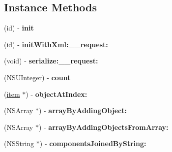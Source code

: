 \subsection*{Instance Methods}
\begin{DoxyCompactItemize}
\item 
\hypertarget{interfaceget_items_by_s_s_c_c_response_adf8f3b643a4ba2013d20ca34a440359d}{}(id) -\/ {\bfseries init}\label{interfaceget_items_by_s_s_c_c_response_adf8f3b643a4ba2013d20ca34a440359d}

\item 
\hypertarget{interfaceget_items_by_s_s_c_c_response_a1d0585c2d9bd9ccbcd6f748835030e3e}{}(id) -\/ {\bfseries init\+With\+Xml\+:\+\_\+\+\_\+request\+:}\label{interfaceget_items_by_s_s_c_c_response_a1d0585c2d9bd9ccbcd6f748835030e3e}

\item 
\hypertarget{interfaceget_items_by_s_s_c_c_response_ae79725ad9b9e49228a5e4a8cfd2f793b}{}(void) -\/ {\bfseries serialize\+:\+\_\+\+\_\+request\+:}\label{interfaceget_items_by_s_s_c_c_response_ae79725ad9b9e49228a5e4a8cfd2f793b}

\item 
\hypertarget{interfaceget_items_by_s_s_c_c_response_a9ba73d066cdc26010832654380dcdc5f}{}(N\+S\+U\+Integer) -\/ {\bfseries count}\label{interfaceget_items_by_s_s_c_c_response_a9ba73d066cdc26010832654380dcdc5f}

\item 
\hypertarget{interfaceget_items_by_s_s_c_c_response_a0c1fa97bef81055c673316169b90689b}{}(\hyperlink{interfaceitem}{item} $\ast$) -\/ {\bfseries object\+At\+Index\+:}\label{interfaceget_items_by_s_s_c_c_response_a0c1fa97bef81055c673316169b90689b}

\item 
\hypertarget{interfaceget_items_by_s_s_c_c_response_ae0facc539d8afc031f8915c3da4913d9}{}(N\+S\+Array $\ast$) -\/ {\bfseries array\+By\+Adding\+Object\+:}\label{interfaceget_items_by_s_s_c_c_response_ae0facc539d8afc031f8915c3da4913d9}

\item 
\hypertarget{interfaceget_items_by_s_s_c_c_response_a7e3cbd3b2d74f447b2e0d32d2bde254d}{}(N\+S\+Array $\ast$) -\/ {\bfseries array\+By\+Adding\+Objects\+From\+Array\+:}\label{interfaceget_items_by_s_s_c_c_response_a7e3cbd3b2d74f447b2e0d32d2bde254d}

\item 
\hypertarget{interfaceget_items_by_s_s_c_c_response_a49aa0eec42ce7f0045131ee575318351}{}(N\+S\+String $\ast$) -\/ {\bfseries components\+Joined\+By\+String\+:}\label{interfaceget_items_by_s_s_c_c_response_a49aa0eec42ce7f0045131ee575318351}


\end{DoxyCompactItemize}
